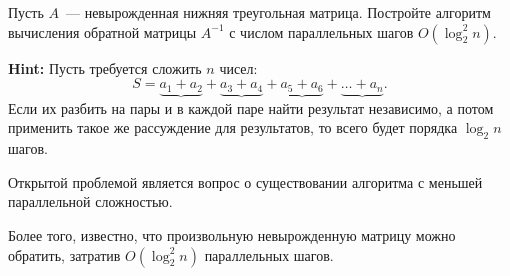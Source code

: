 \begin{exercise}
    Пусть $A$~--- невырожденная нижняя треугольная матрица. Постройте алгоритм вычисления обратной матрицы $A^{-1}$
    с числом параллельных шагов $O(\log_2^2n)$.

    \textbf{Hint:}  Пусть требуется сложить $n$ чисел: 
    \[
        S = \underbrace{a_1+a_2}+\underbrace{a_3+a_4}+\underbrace{a_5+a_6}+\underbrace{\ldots+a_n}.   
    \]
    Если их разбить на пары и в каждой паре найти результат независимо, а потом применить такое же рассуждение 
    для результатов, то всего будет порядка $\log_2 n$ шагов.

    \begin{remark}
        Открытой проблемой является вопрос о существовании алгоритма с меньшей параллельной сложностью.
    \end{remark}
\end{exercise}

\begin{remark}
    Более того, известно, что произвольную невырожденную матрицу можно обратить, затратив $O(\log_2^2 n)$ 
    параллельных шагов.        
\end{remark}

